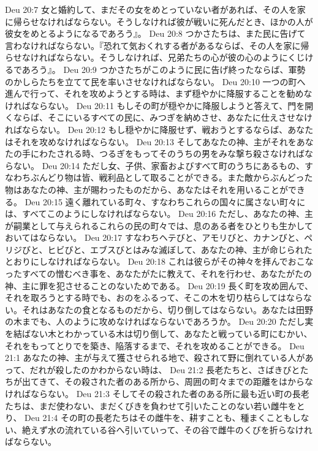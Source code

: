 Deu 20:7  女と婚約して、まだその女をめとっていない者があれば、その人を家に帰らせなければならない。そうしなければ彼が戦いに死んだとき、ほかの人が彼女をめとるようになるであろう』。
Deu 20:8  つかさたちは、また民に告げて言わなければならない。『恐れて気おくれする者があるならば、その人を家に帰らせなければならない。そうしなければ、兄弟たちの心が彼の心のようにくじけるであろう』。
Deu 20:9  つかさたちがこのように民に告げ終ったならば、軍勢のかしらたちを立てて民を率いさせなければならない。
Deu 20:10  一つの町へ進んで行って、それを攻めようとする時は、まず穏やかに降服することを勧めなければならない。
Deu 20:11  もしその町が穏やかに降服しようと答えて、門を開くならば、そこにいるすべての民に、みつぎを納めさせ、あなたに仕えさせなければならない。
Deu 20:12  もし穏やかに降服せず、戦おうとするならば、あなたはそれを攻めなければならない。
Deu 20:13  そしてあなたの神、主がそれをあなたの手にわたされる時、つるぎをもってそのうちの男をみな撃ち殺さなければならない。
Deu 20:14  ただし女、子供、家畜およびすべて町のうちにあるもの、すなわちぶんどり物は皆、戦利品として取ることができる。また敵からぶんどった物はあなたの神、主が賜わったものだから、あなたはそれを用いることができる。
Deu 20:15  遠く離れている町々、すなわちこれらの国々に属さない町々には、すべてこのようにしなければならない。
Deu 20:16  ただし、あなたの神、主が嗣業として与えられるこれらの民の町々では、息のある者をひとりも生かしておいてはならない。
Deu 20:17  すなわちヘテびと、アモリびと、カナンびと、ペリジびと、ヒビびと、エブスびとはみな滅ぼして、あなたの神、主が命じられたとおりにしなければならない。
Deu 20:18  これは彼らがその神々を拝んでおこなったすべての憎むべき事を、あなたがたに教えて、それを行わせ、あなたがたの神、主に罪を犯させることのないためである。
Deu 20:19  長く町を攻め囲んで、それを取ろうとする時でも、おのをふるって、そこの木を切り枯らしてはならない。それはあなたの食となるものだから、切り倒してはならない。あなたは田野の木までも、人のように攻めなければならないであろうか。
Deu 20:20  ただし実を結ばない木とわかっている木は切り倒して、あなたと戦っている町にむかい、それをもってとりでを築き、陥落するまで、それを攻めることができる。
Deu 21:1  あなたの神、主が与えて獲させられる地で、殺されて野に倒れている人があって、だれが殺したのかわからない時は、
Deu 21:2  長老たちと、さばきびとたちが出てきて、その殺された者のある所から、周囲の町々までの距離をはからなければならない。
Deu 21:3  そしてその殺された者のある所に最も近い町の長老たちは、まだ使わない、まだくびきを負わせて引いたことのない若い雌牛をとり、
Deu 21:4  その町の長老たちはその雌牛を、耕すことも、種まくこともしない、絶えず水の流れている谷へ引いていって、その谷で雌牛のくびを折らなければならない。
